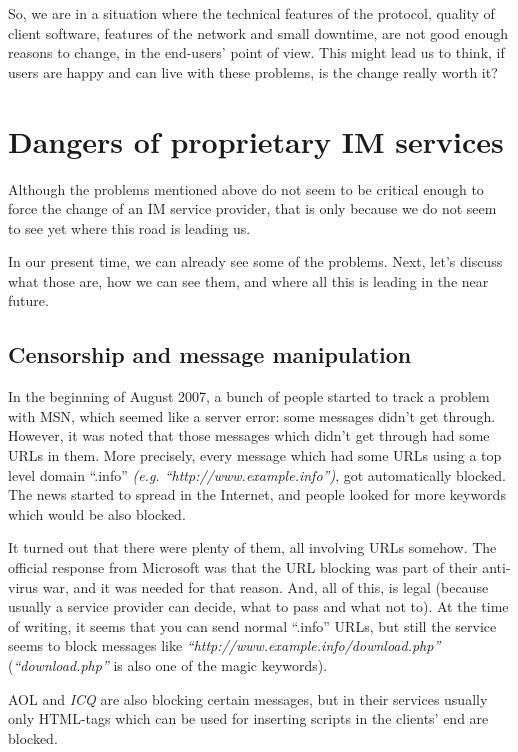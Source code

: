 So, we are in a situation where the technical features of the protocol, quality
of client software, features of the network and small downtime, are not good
enough reasons to change, in the end-users' point of view. This might lead us to
think, if users are happy and can live with these problems, is the change really
worth it?


\section{Dangers of proprietary IM services}
\label{s:jim_client_server:dangers_proprietary}

Although the problems mentioned above do not seem to be critical enough to force
the change of an IM service provider, that is only because we do not seem to see
yet where this road is leading us. 

In our present time, we can already see some of the problems. Next, let's
discuss what those are, how we can see them, and where all this is leading in
the near future.


\subsection{Censorship and message manipulation}
\label{ss:jim_client_server:dangers_proprietary:censorship}

In the beginning of August 2007, a bunch of people started to track a problem
with MSN, which seemed like a server error: some messages didn't get through.
However, it was noted that those messages which didn't get through had some URLs
in them. More precisely, every message which had some URLs using a top level
domain ``.info'' \textit{(e.g. ``http://www.example.info'')}, got automatically
blocked. The news started to spread in the Internet, and people looked for more
keywords which would be also blocked.

It turned out that there were plenty of them, all involving URLs somehow. The
of\hbox{}f\hbox{}icial response from Microsoft was that the URL blocking was
part of their anti-virus war, and it was needed for that reason. And, all of
this, is legal (because usually a service provider can decide, what to pass and
what not to).  At the time of writing, it seems that you can send normal
``.info'' URLs, but still the service seems to block messages like
\textit{``http://www.example.info/download.php''} (\textit{``download.php''} is
also one of the magic keywords).

AOL and \textit{ICQ} are also blocking certain messages, but in their services
usually only HTML-tags which can be used for inserting scripts in the clients'
end are blocked.

